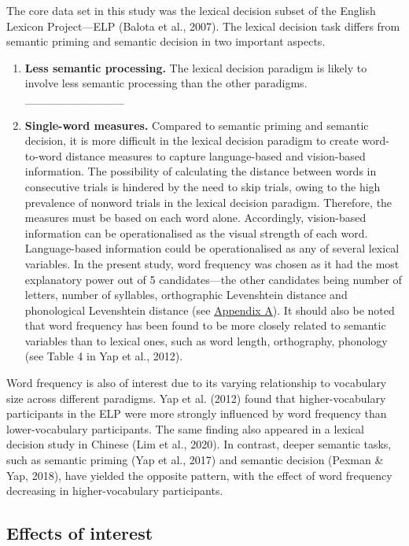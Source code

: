 \documentclass[
  12pt,
  man,floatsintext]{apa7}
\begin{document}
The core data set in this study was the lexical decision subset of the English Lexicon Project---ELP (Balota et al., 2007). The lexical decision task differs from semantic priming and semantic decision in two important aspects.

\begin{enumerate}
\def\labelenumi{\arabic{enumi}.}
\item
  \textbf{Less semantic processing.} The lexical decision paradigm is likely to involve less semantic processing than the other paradigms. \_\_\_\_\_\_\_\_\_\_\_\_
\item
  \textbf{Single-word measures.} Compared to semantic priming and semantic decision, it is more difficult in the lexical decision paradigm to create word-to-word distance measures to capture language-based and vision-based information. The possibility of calculating the distance between words in consecutive trials is hindered by the need to skip trials, owing to the high prevalence of nonword trials in the lexical decision paradigm. Therefore, the measures must be based on each word alone. Accordingly, vision-based information can be operationalised as the visual strength of each word. Language-based information could be operationalised as any of several lexical variables. In the present study, word frequency was chosen as it had the most explanatory power out of 5 candidates---the other candidates being number of letters, number of syllables, orthographic Levenshtein distance and phonological Levenshtein distance (see \protect\hyperlink{appendix-A-lexical-covariates}{\underline{Appendix A}}). It should also be noted that word frequency has been found to be more closely related to semantic variables than to lexical ones, such as word length, orthography, phonology (see Table 4 in Yap et al., 2012).
\end{enumerate}

Word frequency is also of interest due to its varying relationship to vocabulary size across different paradigms. Yap et al. (2012) found that higher-vocabulary participants in the ELP were more strongly influenced by word frequency than lower-vocabulary participants. The same finding also appeared in a lexical decision study in Chinese (Lim et al., 2020). In contrast, deeper semantic tasks, such as semantic priming (Yap et al., 2017) and semantic decision (Pexman \& Yap, 2018), have yielded the opposite pattern, with the effect of word frequency decreasing in higher-vocabulary participants.

\hypertarget{effects-of-interest-2}{%
\subsection{Effects of interest}\label{effects-of-interest-2}}
\end{document}
